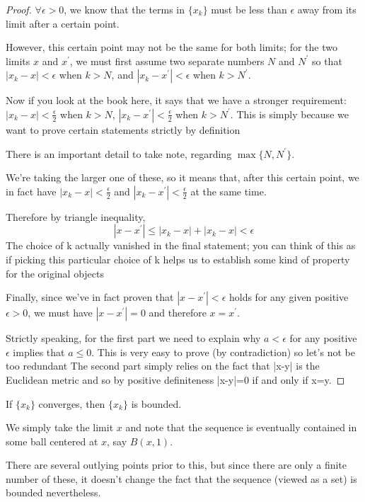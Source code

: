 \begin{proof}
$\forall \epsilon>0$, we know that the terms in $\{x_k\}$ must be less than $\epsilon$ away from its limit after a certain point. 

However, this certain point may not be the same for both limits; for the two limits $x$ and $x^\prime$, we must first assume two separate numbers $N$ and $N^\prime$ so that $|x_k-x|<\epsilon$ when $k>N$, and $|x_k-x^\prime|<\epsilon$ when $k>N^\prime$.

Now if you look at the book here, it says that we have a stronger requirement:
$|x_k-x|<\frac{\epsilon}{2}$ when $k>N$,
$|x_k-x^\prime|<\frac{\epsilon}{2}$ when $k>N^\prime$.
This is simply because we want to prove certain statements strictly by definition



There is an important detail to take note, regarding $\max\{N,N^\prime\}$.

We're taking the larger one of these, so it means that, after this certain point, we in fact have $|x_k-x|<\frac{\epsilon}{2}$ and $|x_k-x^\prime|<\frac{\epsilon}{2}$ at the same time.

Therefore by triangle inequality,
\[ |x-x^\prime| \le |x_k-x| + |x_k-x|<\epsilon \]
The choice of k actually vanished in the final statement; you can think of this as if picking this particular choice of k helps us to establish some kind of property for the original objects

Finally, since we've in fact proven that $|x-x^\prime|<\epsilon$ holds for any given positive $\epsilon>0$, we must have $|x-x^\prime|=0$ and therefore $x=x^\prime$.

Strictly speaking, for the first part we need to explain why $a<\epsilon$ for any positive $\epsilon$ implies that $a \le 0$. 
This is very easy to prove (by contradiction) so let's not be too redundant
The second part simply relies on the fact that |x-y| is the Euclidean metric and so by positive definiteness |x-y|=0 if and only if x=y.
\end{proof}

\begin{proposition}
If $\{x_k\}$ converges, then $\{x_k\}$ is bounded.
\end{proposition}

We simply take the limit $x$ and note that the sequence is eventually contained in some ball centered at $x$, say $B(x,1)$.

There are several outlying points prior to this, but since there are only a finite number of these, it doesn't change the fact that the sequence (viewed as a set) is bounded nevertheless.

